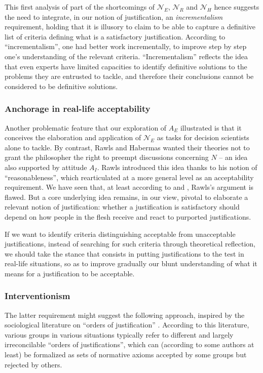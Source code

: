 \documentclass[preprint, french, english, 11pt, authoryear]{elsarticle}%
\begin{document}
This first analysis of part of the shortcomings of $\mathscr{N}_E$, $\mathscr{N}_{R}$ and $\mathscr{N}_{H}$ hence suggests the need to integrate, in our notion of justification, an \emph{incrementalism} requirement, 
holding that it is illusory to claim to be able to capture a definitive list of criteria defining what is a satisfactory justification. According to “incrementalism”, one had better work incrementally, to improve step by step one's understanding of the relevant criteria. 
“Incrementalism” reflects the idea that even experts have limited capacities to identify definitive solutions to the problems they are entrusted to tackle, and therefore their conclusions cannot be considered to be definitive solutions.

\subsubsection{Anchorage in real-life acceptability}
Another problematic feature that our exploration of $A_E$ illustrated is that it conceives the elaboration and application of $\mathscr{N}_E$ as tasks for decision scientists alone to tackle. 
By contrast, Rawls and Habermas wanted their theories not to grant the philosopher the right to preempt discussions concerning $N$ -- an idea also supported by attitude $A_I$. 
Rawls introduced this idea thanks to his notion of ``reasonableness'', which \citeauthor{estlund_democratic_2009} rearticulated at a more general level as an acceptability requirement. 
We have seen that, at least according to \citeauthor{habermas_reconciliation_1995} and \citeauthor{estlund_democratic_2009}, Rawls's argument is flawed. 
But a core underlying idea remains, in our view, pivotal to elaborate a relevant notion of justification: whether a justification is satisfactory should depend on how people in the flesh receive and react to purported justifications.
\begin{changebar}
If we want to identify criteria distinguishing acceptable from unacceptable justifications, instead of searching for such criteria through theoretical reflection, we should take the stance that consists in putting justifications to the test in real-life situations, 
so as to improve gradually our blunt understanding of what it means for a justification to be acceptable.
\end{changebar}

\subsubsection{Interventionism}
The latter requirement might suggest the following approach, inspired by the sociological literature on “orders of justification” \citep{boltanski_justification_2006}. 
According to this literature, various groups in various situations typically refer to different and largely irreconcilable “orders of justifications”, which can (according to some authors at least) be formalized as sets of normative axioms accepted by some groups but rejected by others.
\end{document}
